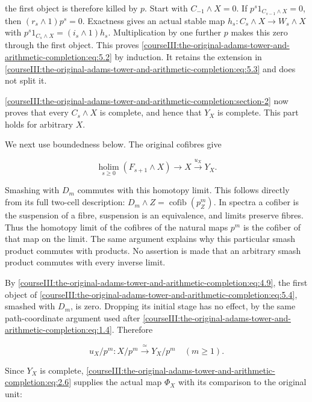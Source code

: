 the first object is therefore killed by \(p\). Start with \(C_{-1}\wedge X=0\). If \(p^s1_{C_{s-1}\wedge X}=0\), then \((r_s\wedge1)p^s=0\). Exactness gives an actual stable map \(h_s:C_s\wedge X\to W_s\wedge X\) with
\(p^s1_{C_s\wedge X}=(i_s\wedge1)h_s\).
Multiplication by one further \(p\) makes this zero through the first object. This proves \eqref{courseIII:the-original-adams-tower-and-arithmetic-completion:eq:5.2} by induction. It retains the extension in \eqref{courseIII:the-original-adams-tower-and-arithmetic-completion:eq:5.3} and does not split it.

\cref{courseIII:the-original-adams-tower-and-arithmetic-completion:section-2} now proves that every \(C_s\wedge X\) is complete, and hence that \(Y_X\) is complete. This part holds for arbitrary \(X\).

We next use boundedness below. The original cofibres give

\begin{equation}
\operatorname*{holim}_{s\geq0}(F_{s+1}\wedge X)
\longrightarrow X\xrightarrow{u_X}Y_X.
\label{courseIII:the-original-adams-tower-and-arithmetic-completion:eq:5.4}
\end{equation}

Smashing with \(D_m\) commutes with this homotopy limit. This follows directly from its full two-cell description: \(D_m\wedge Z=\operatorname{cofib}(p^m_Z)\). In spectra a cofiber is the suspension of a fibre, suspension is an equivalence, and limits preserve fibres. Thus the homotopy limit of the cofibres of the natural maps \(p^m\) is the cofiber of that map on the limit. The same argument explains why this particular smash product commutes with products. No assertion is made that an arbitrary smash product commutes with every inverse limit.

By \eqref{courseIII:the-original-adams-tower-and-arithmetic-completion:eq:4.9}, the first object of \eqref{courseIII:the-original-adams-tower-and-arithmetic-completion:eq:5.4}, smashed with \(D_m\), is zero. Dropping its initial stage has no effect, by the same path-coordinate argument used after \eqref{courseIII:the-original-adams-tower-and-arithmetic-completion:eq:1.4}. Therefore

\begin{equation}
u_X/p^m:X/p^m\xrightarrow{\ \simeq\ }Y_X/p^m
\quad(m\geq1).
\label{courseIII:the-original-adams-tower-and-arithmetic-completion:eq:5.5}
\end{equation}

Since \(Y_X\) is complete, \eqref{courseIII:the-original-adams-tower-and-arithmetic-completion:eq:2.6} supplies the actual map \(\Phi_X\) with its comparison to the original unit:

